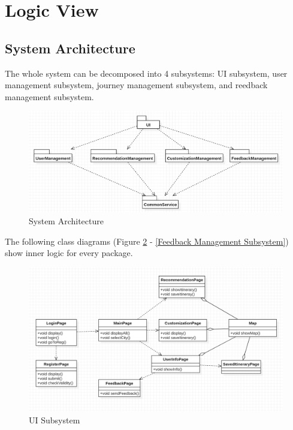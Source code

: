 \documentclass[10pt]{article}
\begin{document}
\section{Logic View}
\subsection{System Architecture}
The whole system can be decomposed into 4 subsystems: UI subsystem, user management subsystem, journey management subsystem, and reedback management subsystem.

\begin{figure}[H]
    \centering
    \includegraphics[width=14cm]{architecture.png}
    \caption{System Architecture}
    \label{System Architecture}
\end{figure}

The following class diagrams (Figure \ref{UI Subsystem} - \ref{Feedback Management Subsystem}) show inner logic for every package.

\begin{figure}[H]
    \centering
    
    \includegraphics[width=14cm]{ui.png}
    \caption{UI Subsystem}
    \label{UI Subsystem}
\end{figure}
\end{document}
